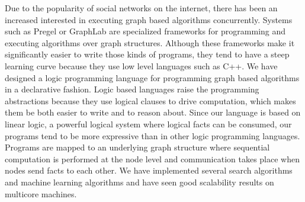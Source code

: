Due to the popularity of social networks on the internet, there has been an increased interested
in executing graph based algorithms concurrently. Systems such as Pregel
or GraphLab are specialized frameworks for programming and executing algorithms
over graph structures. Although these frameworks make it significantly easier to write those kinds
of programs, they tend to have a steep learning curve because they use low level languages such as
C++. We have designed a logic programming language for programming graph based algorithms in a declarative
fashion. Logic based languages raise the programming abstractions because they use logical clauses to drive computation, which makes
them be both easier to write and to reason about. Since our language is based on linear logic, a
powerful logical system where logical facts can be consumed, our programs tend to be more expressive
than in other logic programming languages. Programs are mapped to an underlying graph structure where
sequential computation is performed at the node level and communication takes place when nodes send
facts to each other. We have implemented several search algorithms and machine learning algorithms
and have seen good scalability results on multicore machines.
